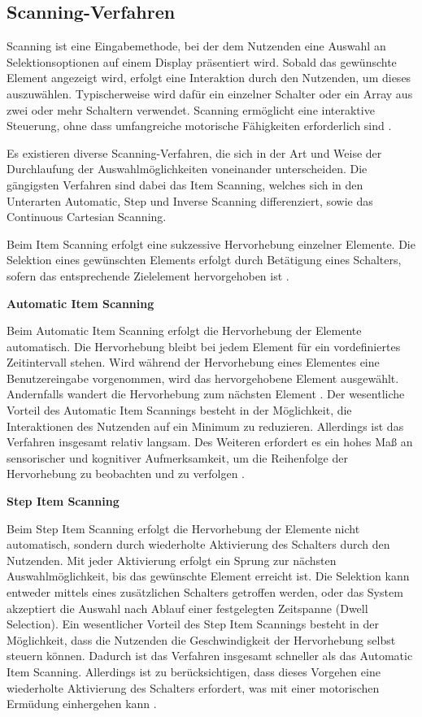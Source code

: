 \subsection{Scanning-Verfahren}
Scanning ist eine Eingabemethode, bei der dem Nutzenden eine Auswahl an Selektionsoptionen auf einem Display präsentiert wird. Sobald das gewünschte Element angezeigt wird, erfolgt eine Interaktion durch den Nutzenden, um dieses auszuwählen. Typischerweise wird dafür ein einzelner Schalter oder ein Array aus zwei oder mehr Schaltern verwendet. Scanning ermöglicht eine interaktive Steuerung, ohne dass umfangreiche motorische Fähigkeiten erforderlich sind \citep{COOK2015117}.

Es existieren diverse Scanning-Verfahren, die sich in der Art und Weise der Durchlaufung der Auswahlmöglichkeiten voneinander unterscheiden. Die gängigsten Verfahren sind dabei das Item Scanning, welches sich in den Unterarten Automatic, Step und Inverse Scanning differenziert, sowie das Continuous Cartesian Scanning.

Beim Item Scanning erfolgt eine sukzessive Hervorhebung einzelner Elemente. Die Selektion eines gewünschten Elements erfolgt durch Betätigung eines Schalters, sofern das entsprechende Zielelement hervorgehoben ist \citep{10.1145/772047.772049}. 

{\normalfont \bfseries Automatic Item Scanning} 

Beim Automatic Item Scanning erfolgt die Hervorhebung der Elemente automatisch. Die Hervorhebung bleibt bei jedem Element für ein vordefiniertes Zeitintervall stehen. Wird während der Hervorhebung eines Elementes eine Benutzereingabe vorgenommen, wird das hervorgehobene Element ausgewählt. Andernfalls wandert die Hervorhebung zum nächsten Element \citep{10.1145/772047.772049}.
Der wesentliche Vorteil des Automatic Item Scannings besteht in der Möglichkeit, die Interaktionen des Nutzenden auf ein Minimum zu reduzieren. Allerdings ist das Verfahren insgesamt relativ langsam. Des Weiteren erfordert es ein hohes Maß an sensorischer und kognitiver Aufmerksamkeit, um die Reihenfolge der Hervorhebung zu beobachten und zu verfolgen \citep{COOK2015117}.

{\normalfont \bfseries Step Item Scanning} 

Beim Step Item Scanning erfolgt die Hervorhebung der Elemente nicht automatisch, sondern durch wiederholte Aktivierung des Schalters durch den Nutzenden. Mit jeder Aktivierung erfolgt ein Sprung zur nächsten Auswahlmöglichkeit, bis das gewünschte Element erreicht ist. Die Selektion kann entweder mittels eines zusätzlichen Schalters getroffen werden, oder das System akzeptiert die Auswahl nach Ablauf einer festgelegten Zeitspanne (Dwell Selection). Ein wesentlicher Vorteil des Step Item Scannings besteht in der Möglichkeit, dass die Nutzenden die Geschwindigkeit der Hervorhebung selbst steuern können. Dadurch ist das Verfahren insgesamt schneller als das Automatic Item Scanning.  Allerdings ist zu berücksichtigen, dass dieses Vorgehen eine wiederholte Aktivierung des Schalters erfordert, was mit einer motorischen Ermüdung einhergehen kann \citep{COOK2015117}.

